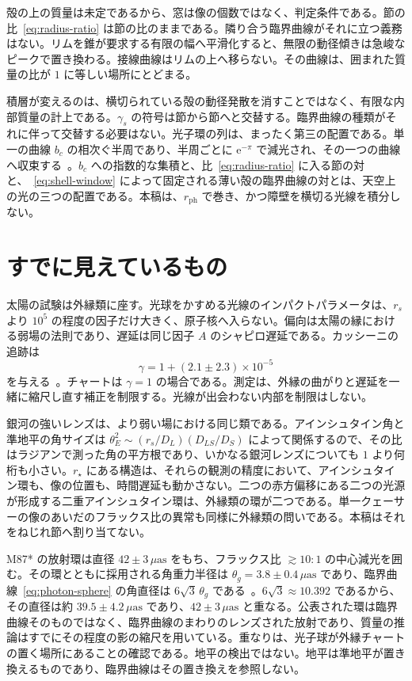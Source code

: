 \documentclass[a4paper]{article}
\begin{document}
殻の上の質量は未定であるから、窓は像の個数ではなく、判定条件である。節の比~\eqref{eq:radius-ratio} は節の比のままである。隣り合う臨界曲線がそれに立つ義務はない。リムを錐が要求する有限の幅へ平滑化すると、無限の動径傾きは急峻なピークで置き換わる。接線曲線はリムの上へ移らない。その曲線は、囲まれた質量の比が \(1\) に等しい場所にとどまる。

積層が変えるのは、横切られている殻の動径発散を消すことではなく、有限な内部質量の計上である。\(\gamma_s\) の符号は節から節へと交替する。臨界曲線の種類がそれに伴って交替する必要はない。光子環の列は、まったく第三の配置である。単一の曲線 \(b_c\) の相次ぐ半周であり、半周ごとに \(\mathrm{e}^{-\pi}\) で減光され、その一つの曲線へ収束する~\cite{Johnson2020}。\(b_c\) への指数的な集積と、比~\eqref{eq:radius-ratio} に入る節の対と、~\eqref{eq:shell-window} によって固定される薄い殻の臨界曲線の対とは、天空上の光の三つの配置である。本稿は、\(r_{\mathrm{ph}}\) で巻き、かつ障壁を横切る光線を積分しない。

\section{すでに見えているもの}
\label{sec:observations}

太陽の試験は外縁類に座す。光球をかすめる光線のインパクトパラメータは、\(r_s\) より \(10^5\) の程度の因子だけ大きく、原子核へ入らない。偏向は太陽の縁における弱場の法則であり、遅延は同じ因子 \(A\) のシャピロ遅延である。カッシーニの追跡は
\begin{equation}
\label{eq:cassini}
\gamma=1+(2.1\pm 2.3)\times 10^{-5}
\end{equation}
を与える~\cite{Bertotti2003}。チャートは \(\gamma=1\) の場合である。測定は、外縁の曲がりと遅延を一緒に縮尺し直す補正を制限する。光線が出会わない内部を制限はしない。

銀河の強いレンズは、より弱い場における同じ類である。アインシュタイン角と準地平の角サイズは \(\theta_E^2\sim(r_s/D_L)(D_{LS}/D_S)\) によって関係するので、その比はラジアンで測った角の平方根であり、いかなる銀河レンズについても \(1\) より何桁も小さい。\(r_\star\) にある構造は、それらの観測の精度において、アインシュタイン環も、像の位置も、時間遅延も動かさない。二つの赤方偏移にある二つの光源が形成する二重アインシュタイン環は、外縁類の環が二つである。単一クェーサーの像のあいだのフラックス比の異常も同様に外縁類の問いである。本稿はそれをねじれ節へ割り当てない。

M87* の放射環は直径 \(42\pm 3\,\mu\mathrm{as}\) をもち、フラックス比 \(\gtrsim 10{:}1\) の中心減光を囲む。その環とともに採用される角重力半径は \(\theta_g=3.8\pm 0.4\,\mu\mathrm{as}\) であり、臨界曲線~\eqref{eq:photon-sphere} の角直径は \(6\sqrt{3}\,\theta_g\) である~\cite{EHT2019}。\(6\sqrt{3}\approx 10.392\) であるから、その直径は約 \(39.5\pm 4.2\,\mu\mathrm{as}\) であり、\(42\pm 3\,\mu\mathrm{as}\) と重なる。公表された環は臨界曲線そのものではなく、臨界曲線のまわりのレンズされた放射であり、質量の推論はすでにその程度の影の縮尺を用いている。重なりは、光子球が外縁チャートの置く場所にあることの確認である。地平の検出ではない。地平は準地平が置き換えるものであり、臨界曲線はその置き換えを参照しない。
\end{document}
